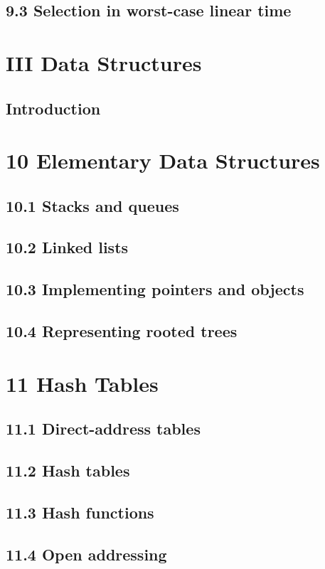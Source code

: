 \documentclass[a4paper]{article}
\begin{document}
\subsection{9.3 Selection in worst-case linear time}

\newpage
\section*{III Data Structures}
\subsection*{Introduction}

\newpage
\section{10 Elementary Data Structures}
\subsection{10.1 Stacks and queues}
\subsection{10.2 Linked lists}
\subsection{10.3 Implementing pointers and objects}
\subsection{10.4 Representing rooted trees}

\newpage
\section{11 Hash Tables}
\subsection{11.1 Direct-address tables}
\subsection{11.2 Hash tables}
\subsection{11.3 Hash functions}
\subsection{11.4 Open addressing}
\end{document}
